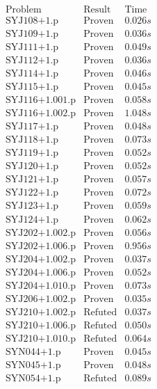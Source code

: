 \documentclass[a4paper,11pt]{report}
\theoremstyle{definition}
\theoremstyle{definition}
\theoremstyle{definition}
\theoremstyle{definition}
\theoremstyle{definition}
\theoremstyle{definition}
\theoremstyle{definition}
\begin{document}
	\begin{minipage}{0.45\textwidth}
		\[\begin{matrix}
			\text{Problem}&\text{Result}&\text{Time}\\
			\text{SYJ108+1.p}&\text{Proven}& 0.026 s\\
			\text{SYJ109+1.p}&\text{Proven}& 0.036 s\\
			\text{SYJ111+1.p}&\text{Proven}& 0.049 s\\
			\text{SYJ112+1.p}&\text{Proven}& 0.036 s\\
			\text{SYJ114+1.p}&\text{Proven}& 0.046 s\\
			\text{SYJ115+1.p}&\text{Proven}& 0.045 s\\
			\text{SYJ116+1.001.p}&\text{Proven}& 0.058 s\\
			\text{SYJ116+1.002.p}&\text{Proven}& 1.048 s\\
			\text{SYJ117+1.p}&\text{Proven}& 0.048 s\\
			\text{SYJ118+1.p}&\text{Proven}& 0.073 s\\
			\text{SYJ119+1.p}&\text{Proven}& 0.052 s\\
			\text{SYJ120+1.p}&\text{Proven}& 0.052 s\\
			\text{SYJ121+1.p}&\text{Proven}& 0.057 s\\
			\text{SYJ122+1.p}&\text{Proven}& 0.072 s\\
			\text{SYJ123+1.p}&\text{Proven}& 0.059 s\\
			\text{SYJ124+1.p}&\text{Proven}& 0.062 s\\
			\text{SYJ202+1.002.p}&\text{Proven}& 0.056 s\\
			\text{SYJ202+1.006.p}&\text{Proven}& 0.956 s\\
			\text{SYJ204+1.002.p}&\text{Proven}& 0.037 s\\
			\text{SYJ204+1.006.p}&\text{Proven}& 0.052 s\\
			\text{SYJ204+1.010.p}&\text{Proven}& 0.073 s\\
			\text{SYJ206+1.002.p}&\text{Proven}& 0.035 s\\
			\text{SYJ210+1.002.p}&\text{Refuted}& 0.037 s\\
			\text{SYJ210+1.006.p}&\text{Refuted}& 0.050 s\\
			\text{SYJ210+1.010.p}&\text{Refuted}& 0.064 s\\
			\text{SYN044+1.p}&\text{Proven}& 0.045 s\\
			\text{SYN045+1.p}&\text{Proven}& 0.048 s\\
			\text{SYN054+1.p}&\text{Refuted}& 0.089 s\\

\end{matrix}\]
\end{minipage}
\end{document}
